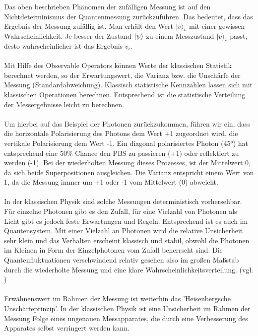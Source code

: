 Das oben beschrieben Phänomen der zufälligen Messung ist auf den Nichtdeterminismus der Quantenmessung zurückzuführen. Das bedeutet, dass das Ergebnis der Messung zufällig ist. Man erhält den Wert $\ket v_i$ mit einer gewissen Wahrscheinlichkeit.
Je besser der Zustand $\ket \psi$ zu einem Messzustand $\ket v_i$ passt, desto wahrscheinlicher ist das Ergebnis $v_i$. \\
\\
Mit Hilfe des Observable Operators können Werte der klassischen Statistik berechnet werden, so der Erwartungswert, die Varianz bzw. die Unschärfe der Messung (Standardabweichung). 
Klassisch statistische Kennzahlen lassen sich mit klassischen Operationen berechnen. Entsprechend ist die statistische Verteilung der Messergebnisse leicht zu berechnen. \\
\\ 
Um hierbei auf das Beispiel der Photonen zurückzukommen, führen wir ein, dass die horizontale Polarisierung des Photons dem Wert +1 zugeordnet wird, die vertikale Polarisierung dem Wert -1.
Ein diagonal polarisiertes Photon (45°) hat entsprechend eine 50\% Chance den PBS zu passieren (+1) oder reflektiert zu werden (-1). Bei der wiederholten Messung dieses Prozesses, ist der Mittelwert 0, da sich beide Superpositionen ausgleichen.
Die Varianz entspricht einem Wert von 1, da die Messung immer um +1 oder -1 vom Mittelwert (0) abweicht. \\
\\
In der klassischen Physik sind solche Messungen deterministisch vorhersehbar. Für einzelne Photonen gibt es den Zufall, für eine Vielzahl von Photonen als Licht gibt es jedoch feste Erwartungen und Regeln.
Entsprechend ist es auch im Quantensystem. Mit einer Vielzahl an Photonen wird die relative Unsicherheit sehr klein und das Verhalten erscheint klassisch und stabil, obwohl die Photonen im Kleinen in Form der Einzelphotonen vom Zufall beherrscht sind.
Die Quantenfluktuationen verschwindend relativ gesehen also im großen Maßstab durch die wiederholte Messung und eine klare Wahrscheinlichkeitsverteilung.
(vgl. \cite[Ch. 1.9.2]{kasirajan_fundamentals_2021})
\\ \\
Erwähnenswert im Rahmen der Messung ist weiterhin das 'Heisenbergsche Unschärfeprinzip'. In der klassischen Physik ist eine Unsicherheit im Rahmen der Messung Folge eines ungenauen Messapparates, die durch eine Verbesserung des Apparates selbst verringert werden kann. \\
